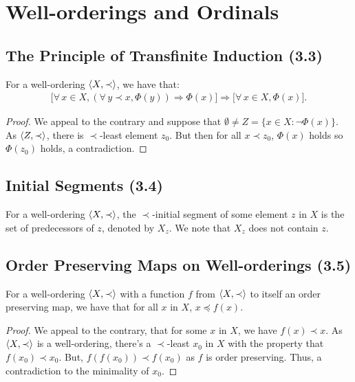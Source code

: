 \section{Well-orderings and Ordinals}

\subsection{The Principle of Transfinite Induction (3.3)} \label{3.3}

For a well-ordering ${\langle X, \prec \rangle}$, we have that: \begin{align*}
    \bigl[
        \forall \, x \in X, (\forall \, y \prec x, \Phi(y)) \Longrightarrow \Phi(x)
    \bigr] \Longrightarrow 
    \bigl[ \forall \, x \in X, \Phi(x) \bigr].
\end{align*}

\begin{proof}
    We appeal to the contrary and suppose that 
    $\emptyset \neq Z = \{x \in X : \neg \Phi(x)\}$.
    As ${\langle Z, \prec \rangle}$, there is $\prec$-least element $z_0$.
    But then for all $x \prec z_0$, $\Phi(x)$ holds so $\Phi(z_0)$ holds, 
    a contradiction.
\end{proof}

\subsection{Initial Segments (3.4)} \label{3.4}

For a well-ordering ${\langle X, \prec \rangle}$, the $\prec$-initial
segment of some element $z$ in $X$ is the set of predecessors of $z$,
denoted by $X_z$. We note that $X_z$ does not contain $z$.

\subsection{Order Preserving Maps on Well-orderings (3.5)} \label{3.5}

For a well-ordering ${\langle X, \prec \rangle}$ with a function $f$ from ${\langle X, \prec \rangle}$ 
to itself an order preserving map, we have that for all $x$ in $X$, $x \preceq f(x)$.

\begin{proof}
    We appeal to the contrary, that for some $x$ in $X$, 
    we have $f(x) \prec x$. As ${\langle X, \prec \rangle}$ is a well-ordering, there's a
    $\prec$-least $x_0$ in $X$ with the property that $f(x_0) \prec x_0$. 
    But, $f(f(x_0)) \prec f(x_0)$ as $f$ is order preserving. Thus, a 
    contradiction to the minimality of $x_0$.
\end{proof}

